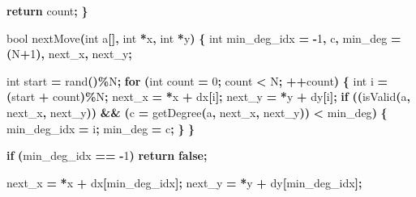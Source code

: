 \documentclass[
]{article}
\newenvironment{Shaded}{\begin{snugshade}}{\end{snugshade}}
\newcommand{\ControlFlowTok}[1]{\textcolor[rgb]{0.13,0.29,0.53}{\textbf{#1}}}
\newcommand{\DataTypeTok}[1]{\textcolor[rgb]{0.13,0.29,0.53}{#1}}
\newcommand{\DecValTok}[1]{\textcolor[rgb]{0.00,0.00,0.81}{#1}}
\newcommand{\KeywordTok}[1]{\textcolor[rgb]{0.13,0.29,0.53}{\textbf{#1}}}
\newcommand{\NormalTok}[1]{#1}
\newcommand{\OperatorTok}[1]{\textcolor[rgb]{0.81,0.36,0.00}{\textbf{#1}}}
\begin{document}
\begin{Shaded}
\begin{Highlighting}[]
    \ControlFlowTok{return}\NormalTok{ count}\OperatorTok{;}
\OperatorTok{\}}

\DataTypeTok{bool}\NormalTok{ nextMove}\OperatorTok{(}\DataTypeTok{int}\NormalTok{ a}\OperatorTok{[],} \DataTypeTok{int} \OperatorTok{*}\NormalTok{x}\OperatorTok{,} \DataTypeTok{int} \OperatorTok{*}\NormalTok{y}\OperatorTok{)}
\OperatorTok{\{}
    \DataTypeTok{int}\NormalTok{ min\_deg\_idx }\OperatorTok{=} \OperatorTok{{-}}\DecValTok{1}\OperatorTok{,}\NormalTok{ c}\OperatorTok{,}\NormalTok{ min\_deg }\OperatorTok{=} \OperatorTok{(}\NormalTok{N}\OperatorTok{+}\DecValTok{1}\OperatorTok{),}\NormalTok{ next\_x}\OperatorTok{,}\NormalTok{ next\_y}\OperatorTok{;}

    \DataTypeTok{int}\NormalTok{ start }\OperatorTok{=}\NormalTok{ rand}\OperatorTok{()\%}\NormalTok{N}\OperatorTok{;}
    \ControlFlowTok{for} \OperatorTok{(}\DataTypeTok{int}\NormalTok{ count }\OperatorTok{=} \DecValTok{0}\OperatorTok{;}\NormalTok{ count }\OperatorTok{\textless{}}\NormalTok{ N}\OperatorTok{;} \OperatorTok{++}\NormalTok{count}\OperatorTok{)}
    \OperatorTok{\{}
        \DataTypeTok{int}\NormalTok{ i }\OperatorTok{=} \OperatorTok{(}\NormalTok{start }\OperatorTok{+}\NormalTok{ count}\OperatorTok{)\%}\NormalTok{N}\OperatorTok{;}
\NormalTok{        next\_x }\OperatorTok{=} \OperatorTok{*}\NormalTok{x }\OperatorTok{+}\NormalTok{ dx}\OperatorTok{[}\NormalTok{i}\OperatorTok{];}
\NormalTok{        next\_y }\OperatorTok{=} \OperatorTok{*}\NormalTok{y }\OperatorTok{+}\NormalTok{ dy}\OperatorTok{[}\NormalTok{i}\OperatorTok{];}
        \ControlFlowTok{if} \OperatorTok{((}\NormalTok{isValid}\OperatorTok{(}\NormalTok{a}\OperatorTok{,}\NormalTok{ next\_x}\OperatorTok{,}\NormalTok{ next\_y}\OperatorTok{))} \OperatorTok{\&\&} \OperatorTok{(}\NormalTok{c }\OperatorTok{=}\NormalTok{ getDegree}\OperatorTok{(}\NormalTok{a}\OperatorTok{,}\NormalTok{ next\_x}\OperatorTok{,}\NormalTok{ next\_y}\OperatorTok{))} \OperatorTok{\textless{}}\NormalTok{ min\_deg}\OperatorTok{)}
        \OperatorTok{\{}
\NormalTok{            min\_deg\_idx }\OperatorTok{=}\NormalTok{ i}\OperatorTok{;}
\NormalTok{            min\_deg }\OperatorTok{=}\NormalTok{ c}\OperatorTok{;}
        \OperatorTok{\}}
    \OperatorTok{\}}

    \ControlFlowTok{if} \OperatorTok{(}\NormalTok{min\_deg\_idx }\OperatorTok{==} \OperatorTok{{-}}\DecValTok{1}\OperatorTok{)}
        \ControlFlowTok{return} \KeywordTok{false}\OperatorTok{;}

\NormalTok{    next\_x }\OperatorTok{=} \OperatorTok{*}\NormalTok{x }\OperatorTok{+}\NormalTok{ dx}\OperatorTok{[}\NormalTok{min\_deg\_idx}\OperatorTok{];}
\NormalTok{    next\_y }\OperatorTok{=} \OperatorTok{*}\NormalTok{y }\OperatorTok{+}\NormalTok{ dy}\OperatorTok{[}\NormalTok{min\_deg\_idx}\OperatorTok{];}


\end{Highlighting}
\end{Shaded}
\end{document}
